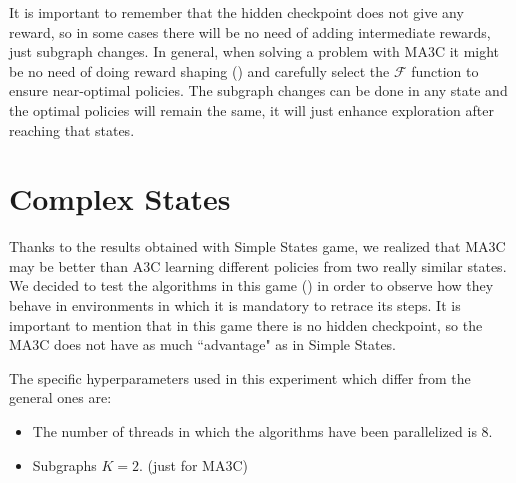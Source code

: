 It is important to remember that the hidden checkpoint does not give any reward, so in some cases there will be no need
of adding intermediate rewards, just subgraph changes.
In general, when solving a problem with \ac{MA3C} it might be no need of doing reward shaping ()
and carefully select the $\mathcal{F}$ function to ensure near-optimal policies.
The subgraph changes can be done in any state and the optimal policies will remain the same, it will just enhance exploration
after reaching that states.

\section{Complex States}

Thanks to the results obtained with Simple States game, we realized that \ac{MA3C} may be better than \ac{A3C} learning
different policies from two really similar states.
We decided to test the algorithms in this game () in order to observe how they
behave in environments in which it is mandatory to retrace its steps.
It is important to mention that in this game there is no hidden checkpoint, so the \ac{MA3C} does not have as much
``advantage" as in Simple States.

The specific hyperparameters used in this experiment which differ from the general ones are:
\begin{itemize}
    \item The number of threads in which the algorithms have been parallelized is $8$.
    \item Subgraphs $K = 2$. (just for \ac{MA3C})
\end{itemize}

